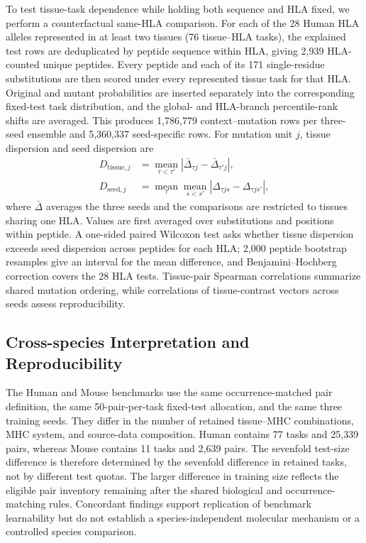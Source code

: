 To test tissue-task dependence while holding both sequence and HLA fixed, we perform a counterfactual same-HLA comparison. For each of the 28 Human HLA alleles represented in at least two tissues (76 tissue--HLA tasks), the explained test rows are deduplicated by peptide sequence within HLA, giving 2,939 HLA-counted unique peptides. Every peptide and each of its 171 single-residue substitutions are then scored under every represented tissue task for that HLA. Original and mutant probabilities are inserted separately into the corresponding fixed-test task distribution, and the global- and HLA-branch percentile-rank shifts are averaged. This produces 1,786,779 context--mutation rows per three-seed ensemble and 5,360,337 seed-specific rows. For mutation unit \(j\), tissue dispersion and seed dispersion are
\[
\begin{aligned}
D_{\mathrm{tissue},j}
&=\operatorname*{mean}_{\tau<\tau'}
\left|\bar{\Delta}_{\tau j}-\bar{\Delta}_{\tau' j}\right|,\\
D_{\mathrm{seed},j}
&=\operatorname*{mean}_{\tau}\operatorname*{mean}_{s<s'}
\left|\Delta_{\tau js}-\Delta_{\tau js'}\right|,
\end{aligned}
\]
where \(\bar{\Delta}\) averages the three seeds and the comparisons are restricted to tissues sharing one HLA. Values are first averaged over substitutions and positions within peptide. A one-sided paired Wilcoxon test asks whether tissue dispersion exceeds seed dispersion across peptides for each HLA; 2,000 peptide bootstrap resamples give an interval for the mean difference, and Benjamini--Hochberg correction covers the 28 HLA tests. Tissue-pair Spearman correlations summarize shared mutation ordering, while correlations of tissue-contrast vectors across seeds assess reproducibility.

\subsection{Cross-species Interpretation and Reproducibility}

The Human and Mouse benchmarks use the same occurrence-matched pair definition, the same 50-pair-per-task fixed-test allocation, and the same three training seeds. They differ in the number of retained tissue--MHC combinations, MHC system, and source-data composition. Human contains 77 tasks and 25,339 pairs, whereas Mouse contains 11 tasks and 2,639 pairs. The sevenfold test-size difference is therefore determined by the sevenfold difference in retained tasks, not by different test quotas. The larger difference in training size reflects the eligible pair inventory remaining after the shared biological and occurrence-matching rules. Concordant findings support replication of benchmark learnability but do not establish a species-independent molecular mechanism or a controlled species comparison.

